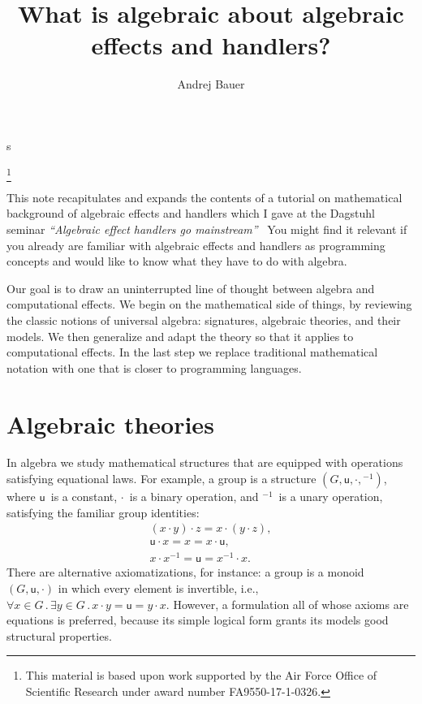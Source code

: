 s\documentclass{amsart}
\newcommand{\all}[1]{\forall #1 \,.\,} %
\newcommand{\some}[1]{\exists #1 \,.\,} %
\begin{document}
\title{What is algebraic about algebraic effects and handlers?}

\author{Andrej Bauer}
\address{Andrej Bauer\\
Faculty of mathematics and Physics\\
University of Ljubljana\\
Jadranska 19\\
1000 Ljubljana\\
Slovenia}
\thanks{This material is based upon work supported by the Air Force Office of
  Scientific Research under award number FA9550-17-1-0326.}


\maketitle

This note recapitulates and expands the contents of a tutorial on mathematical
background of algebraic effects and handlers which I gave at the Dagstuhl
seminar \emph{``Algebraic effect handlers go
  mainstream''}~\cite{chandrasekaran18:_algeb} You might find it relevant if you
already are familiar with algebraic effects and handlers as programming concepts
and would like to know what they have to do with algebra.

Our goal is to draw an uninterrupted line of thought between algebra and
computational effects. We begin on the mathematical side of things, by reviewing
the classic notions of universal algebra: signatures, algebraic theories, and
their models. We then generalize and adapt the theory so that it applies to
computational effects. In the last step we replace traditional mathematical
notation with one that is closer to programming languages.


\section{Algebraic theories}
\label{sec:algebraic-theories}


In algebra we study mathematical structures that are equipped with operations satisfying
equational laws. For example, a group is a structure $(G, \mathsf{u}, {\cdot}, {}^{-1})$,
where $\mathsf{u}$~is a constant, $\cdot$~is a binary operation, and ${}^{-1}$~is a unary
operation, satisfying the familiar group identities:
%
\begin{gather*}
  (x \cdot y) \cdot z = x \cdot (y \cdot z),\\
  \mathsf{u} \cdot x = x = x \cdot \mathsf{u},\\
  x \cdot x^{-1} = \mathsf{u} = x^{-1} \cdot x.
\end{gather*}
%
There are alternative axiomatizations, for instance: a group is a monoid
$(G, \mathsf{u}, {\cdot})$ in which every element is invertible, i.e.,
$\all{x \in G} \some{y \in G} x \cdot y = \mathsf{u} = y \cdot x$. However, a
formulation all of whose axioms are equations is preferred, because its simple
logical form grants its models good structural properties.
\end{document}

